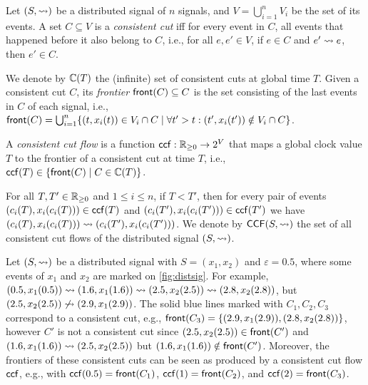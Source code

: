 \begin{definition}
	Let $(S, {\rightsquigarrow})$ be a distributed signal of $n$ signals, and $V = \bigcup_{i = 1}^{n} V_i$ be the set of its events.
	A set $C \subseteq V$ is a \emph{consistent cut} iff for every event in $C$, all events that happened before  it also belong to $C$, i.e., for all $e, e' \in V$, if $e \in C$ and $e' \rightsquigarrow e$, then $e' \in C$.
\end{definition}

We denote by $\mathbb{C}(T)$ the (infinite) set of consistent cuts at global time $T$.
Given a consistent cut $C$, its \emph{frontier} $\mathsf{front}(C) \subseteq C$ is the set consisting of the last events in $C$ of each signal, i.e., $\fr(C) = \bigcup_{i = 1}^{n} \{ (t, x_i(t)) \in V_i \cap C \st \forall t' > t : (t', x_i(t')) \notin V_i \cap C \}$.

\begin{definition}
A \emph{consistent cut flow} is a function $\mathsf{ccf} : \mathbb{R}_{\geq 0} \to 2^V$ that maps a global clock value $T$ to the frontier of a consistent cut at time $T$, i.e., $\ccf(T) \in \{\fr(C) \st C \in \CC(T)\}$.
\end{definition}

For all $T,T' \in \mathbb{R}_{\geq 0}$ and $1 \leq i \leq n$, if $T < T'$, then for every pair of events $(c_i(T), x_i(c_i(T))) \in \mathsf{ccf}(T)$ and $(c_i(T'), x_i(c_i(T'))) \in \mathsf{ccf}(T')$ we have $(c_i(T), x_i(c_i(T))) \rightsquigarrow (c_i(T'), x_i(c_i(T')))$.
We denote by $\mathsf{CCF}(S,{\rightsquigarrow})$ the set of all consistent cut flows of the distributed signal $(S,{\rightsquigarrow})$.

\begin{example} \label{ex:distsig}
	Let $(S,{\rightsquigarrow})$ be a distributed signal with $S = (x_1, x_2)$ and $\varepsilon = 0.5$, where some events of $x_1$ and $x_2$ are marked on \cref{fig:distsig}.
	For example, $(0.5, x_1(0.5)) \rightsquigarrow (1.6, x_1(1.6)) \rightsquigarrow (2.5, x_2(2.5)) \rightsquigarrow (2.8, x_2(2.8))$, but $(2.5, x_2(2.5)) \not\rightsquigarrow (2.9, x_1(2.9))$.
	The solid blue lines marked with $C_1, C_2, C_3$ correspond to a consistent cut, e.g., $\mathsf{front}(C_3) = \{(2.9, x_1(2.9)), (2.8, x_2(2.8))\}$, however $C'$ is not a consistent cut since $(2.5, x_2(2.5)) \in \mathsf{front}(C')$ and $(1.6, x_1(1.6)) \rightsquigarrow (2.5, x_2(2.5))$ but $(1.6, x_1(1.6)) \notin \mathsf{front}(C')$.
	Moreover, the frontiers of these consistent cuts can be seen as produced by a consistent cut flow $\mathsf{ccf}$, e.g., with $\mathsf{ccf}(0.5) = \mathsf{front}(C_1)$, $\mathsf{ccf}(1) = \mathsf{front}(C_2)$, and $\mathsf{ccf}(2) = \mathsf{front}(C_3)$.	
\end{example}


